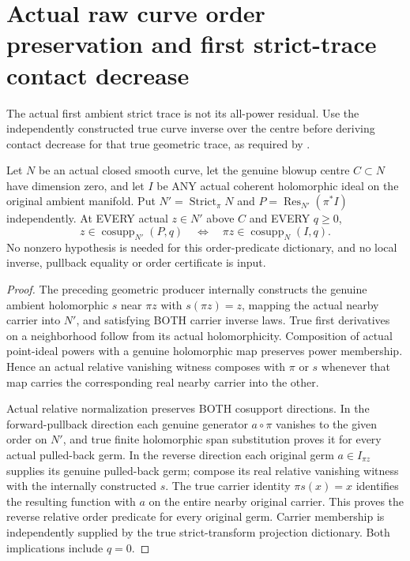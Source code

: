 \section{Actual raw curve order preservation and first strict-trace contact decrease}

The actual first ambient strict trace is not its all-power residual.
Use the independently constructed true curve inverse over the centre
before deriving contact decrease for that true geometric trace, as required
by \cite[Remark 12.6 and pp.~293--295]{bierstone-milman97-invent-math}.

\begin{theorem}
\label{hir:sharp-actual-curve-raw-total-cosupport-above-centre}
\leanok
Let $N$ be an actual closed smooth curve, let the genuine blowup centre
$C\subset N$ have dimension zero, and let $I$ be ANY actual coherent
holomorphic ideal on the original ambient manifold. Put
$N'=\operatorname{Strict}_\pi N$ and
$P=\operatorname{Res}_{N'}(\pi^*I)$ independently. At EVERY actual
$z\in N'$ above $C$ and EVERY $q\ge0$,
\[
 z\in\operatorname{cosupp}_{N'}(P,q)
 \quad\Longleftrightarrow\quad
 \pi z\in\operatorname{cosupp}_N(I,q).
\]
No nonzero hypothesis is needed for this order-predicate dictionary, and
no local inverse, pullback equality or order certificate is input.
\end{theorem}
\begin{proof}
The preceding geometric producer internally constructs the genuine
ambient holomorphic $s$ near $\pi z$ with $s(\pi z)=z$, mapping the
actual nearby carrier into $N'$, and satisfying BOTH carrier inverse
laws. True first derivatives on a neighborhood follow from its actual
holomorphicity. Composition of actual point-ideal powers with a genuine
holomorphic map preserves power membership. Hence an actual relative
vanishing witness composes with $\pi$ or $s$ whenever that map carries
the corresponding real nearby carrier into the other.

Actual relative normalization preserves BOTH cosupport directions.
In the forward-pullback direction each genuine generator $a\circ\pi$
vanishes to the given order on $N'$, and true finite holomorphic span
substitution proves it for every actual pulled-back germ. In the reverse
direction each original germ $a\in I_{\pi z}$ supplies its genuine
pulled-back germ; compose its real relative vanishing witness with the
internally constructed $s$. The true carrier identity $\pi s(x)=x$
identifies the resulting function with $a$ on the entire nearby original
carrier. This proves the reverse relative order predicate for every
original germ. Carrier membership is independently supplied by the true
strict-transform projection dictionary. Both implications include $q=0$.
\end{proof}

